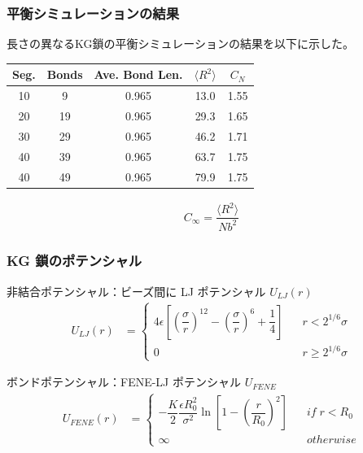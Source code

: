 \documentclass[11pt, dvipdfmx]{beamer}
\begin{document}
\begin{appendix}
\begin{frame}
\frametitle{平衡シミュレーションの結果}

長さの異なるKG鎖の平衡シミュレーションの結果を以下に示した。

\begin{table}[htb]
 \centering
 \begin{tabular}{c c c c c} \hline
Seg.	& Bonds	& Ave. Bond Len.	& $\langle R^2 \rangle$	& $C_{N}$	\\ \hline \hline	
10		& 9		& 0.965				& 13.0			& 1.55			\\ \hline	
20		& 19	& 0.965				& 29.3			& 1.65			\\ \hline	
30		& 29	& 0.965				& 46.2			& 1.71			\\ \hline	
40		& 39	& 0.965				& 63.7			& 1.75			\\ \hline	
40		& 49	& 0.965				& 79.9			& 1.75			\\ \hline
 \end{tabular}
\end{table}

\vspace{-5mm}
\begin{align*}
C_{\infty} = \dfrac{\langle R^2 \rangle}{N b^2}
\end{align*}
\end{frame}

\begin{frame}
\frametitle{KG 鎖のポテンシャル}

\small
非結合ポテンシャル：ビーズ間に LJ ポテンシャル $U_{LJ}(r)$
\begin{align*}
U_{LJ}(r) &= 
\begin{cases}
4 \epsilon\left[\left(\dfrac{\sigma}{r}\right)^{12} - \left(\dfrac{\sigma}{r}\right)^{6} + \dfrac{1}{4} \right] \;\;\; & r< 2^{1/6} \sigma \\[8pt]
0 \;\;\; & r \geq 2^{1/6} \sigma
\end{cases}
\end{align*}

ボンドポテンシャル：FENE-LJ ポテンシャル $U_{FENE}$
\begin{align*}
U_{FENE}(r) &= 
\begin{cases}
-\dfrac{K}{2}\dfrac{\epsilon R_0^2}{\sigma^2} \ln \left[1-\left(\dfrac{r}{R_0}\right)^2 \right] \;\;\; & if \; r< R_0 \\[8pt]
\infty \;\;\; & otherwise
\end{cases}
\end{align*}


\end{frame}
\end{appendix}
\end{document}
